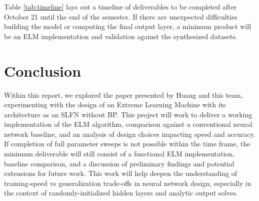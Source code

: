 \documentclass[12pt]{article}
\begin{document}
Table \ref{tab:timeline} lays out a timeline of deliverables to be completed after October 21 until the end of the semester. If there are unexpected difficulties building the model or computing the final output layer, a minimum product will be an ELM implementation and validation against the synthesized datasets.

\section{Conclusion}
Within this report, we explored the paper presented by Huang \cite{huang2006extreme} and this team, experimenting with the design of an Extreme Learning Machine with its architecture as an SLFN without BP. This project will work to deliver a working implementation of the ELM algorithm, comparison against a conventional neural network baseline, and an analysis of design choices impacting speed and accuracy. If completion of full parameter sweeps is not possible within the time frame, the minimum deliverable will still consist of a functional ELM implementation, baseline comparison, and a discussion of preliminary findings and potential extensions for future work. This work will help deepen the understanding of training-speed vs generalization trade-offs in neural network design, especially in the context of randomly-initialized hidden layers and analytic output solves.

\newpage


\end{document}
